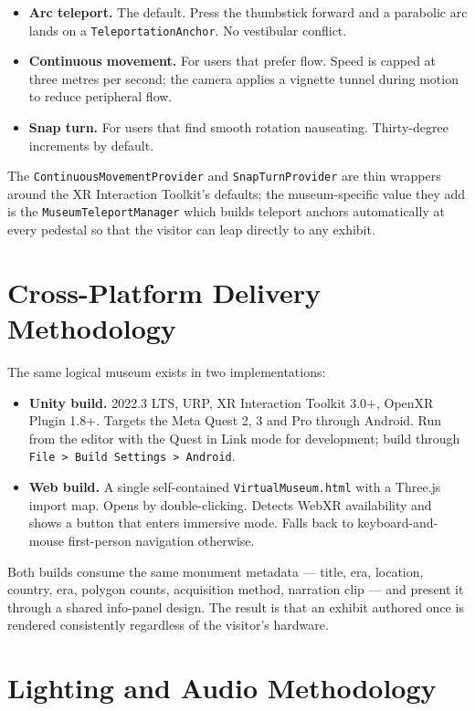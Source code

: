\begin{itemize}
\item \textbf{Arc teleport.} The default. Press the thumbstick forward and a parabolic arc lands on a \texttt{TeleportationAnchor}. No vestibular conflict.
\item \textbf{Continuous movement.} For users that prefer flow. Speed is capped at three metres per second; the camera applies a vignette tunnel during motion to reduce peripheral flow.
\item \textbf{Snap turn.} For users that find smooth rotation nauseating. Thirty-degree increments by default.
\end{itemize}

The \texttt{ContinuousMovementProvider} and \texttt{SnapTurnProvider} are thin wrappers around the XR Interaction Toolkit's defaults; the museum-specific value they add is the \texttt{MuseumTeleportManager} which builds teleport anchors automatically at every pedestal so that the visitor can leap directly to any exhibit.

\section{Cross-Platform Delivery Methodology}

The same logical museum exists in two implementations:

\begin{itemize}
\item \textbf{Unity build.} 2022.3 LTS, URP, XR Interaction Toolkit 3.0+, OpenXR Plugin 1.8+. Targets the Meta Quest 2, 3 and Pro through Android. Run from the editor with the Quest in Link mode for development; build through \texttt{File\,>\,Build Settings\,>\,Android}.
\item \textbf{Web build.} A single self-contained \texttt{VirtualMuseum.html} with a Three.js import map. Opens by double-clicking. Detects WebXR availability and shows a button that enters immersive mode. Falls back to keyboard-and-mouse first-person navigation otherwise.
\end{itemize}

Both builds consume the same monument metadata --- title, era, location, country, era, polygon counts, acquisition method, narration clip --- and present it through a shared info-panel design. The result is that an exhibit authored once is rendered consistently regardless of the visitor's hardware.

\section{Lighting and Audio Methodology}

